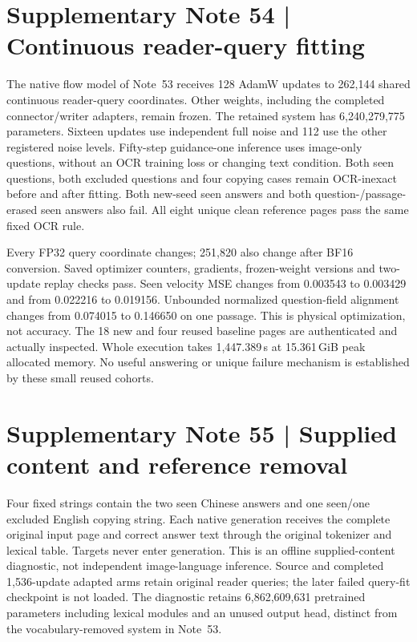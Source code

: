 \documentclass[10pt,a4paper]{article}
\begin{document}
\clearpage
\section*{Supplementary Note 54 | Continuous reader-query fitting}
\label{note:query-fit}
The native flow model of Note~53 receives 128 AdamW updates to 262,144 shared
continuous reader-query coordinates. Other weights, including the completed
connector/writer adapters, remain frozen. The retained system has
6,240,279,775 parameters. Sixteen updates use independent full noise and 112
use the other registered noise levels. Fifty-step guidance-one inference
uses image-only questions, without an OCR training loss or changing text
condition. Both seen questions, both excluded questions and four copying
cases remain OCR-inexact before and after fitting. Both new-seed seen answers
and both question-/passage-erased seen answers also fail. All eight unique
clean reference pages pass the same fixed OCR rule.

Every FP32 query coordinate changes; 251,820 also change after BF16
conversion. Saved optimizer counters, gradients, frozen-weight versions and
two-update replay checks pass. Seen velocity MSE changes from 0.003543 to
0.003429 and from 0.022216 to 0.019156. Unbounded normalized question-field
alignment changes from 0.074015 to 0.146650 on one passage. This is physical
optimization, not accuracy. The 18 new and four reused baseline pages are
authenticated and actually inspected. Whole execution takes 1,447.389\,s at
15.361\,GiB peak allocated memory. No useful answering or unique failure
mechanism is established by these small reused cohorts.

\section*{Supplementary Note 55 | Supplied content and reference removal}
\label{note:writer-controls}
Four fixed strings contain the two seen Chinese answers and one seen/one
excluded English copying string. Each native generation receives the complete
original input page and correct answer text through the original tokenizer
and lexical table. Targets never enter generation. This is an offline
supplied-content diagnostic, not independent image-language inference.
Source and completed 1,536-update adapted arms retain original reader queries;
the later failed query-fit checkpoint is not loaded. The diagnostic retains
6,862,609,631 pretrained parameters including lexical modules and an unused
output head, distinct from the vocabulary-removed system in Note~53.
\end{document}
